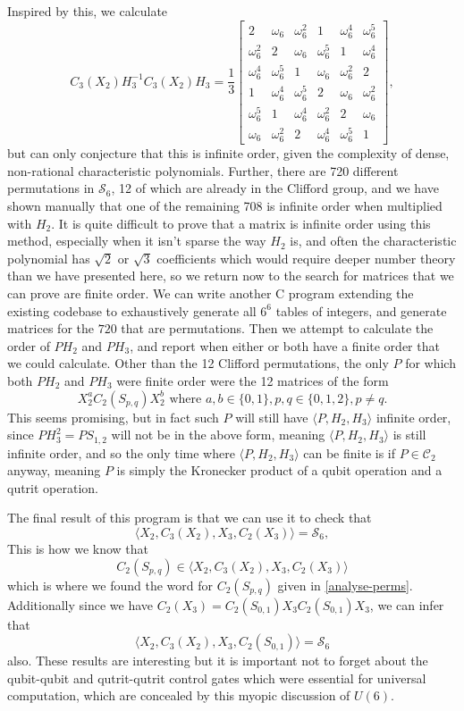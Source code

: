 Inspired by this, we calculate
\[C_3(X_2) H_3^{-1} C_3(X_2) H_3 =
\frac{1}{3} \begin{bmatrix}
	2 & \omega_6 & \omega_6^2 & 1 & \omega_6^4 & \omega_6^5 \\
	\omega_6^2 & 2 & \omega_6 & \omega_6^5 & 1 & \omega_6^4 \\
	\omega_6^4 & \omega_6^5 & 1 & \omega_6 & \omega_6^2 & 2 \\
	1 & \omega_6^4 & \omega_6^5 & 2 & \omega_6 & \omega_6^2 \\
	\omega_6^5 & 1 & \omega_6^4 & \omega_6^2 & 2 & \omega_6 \\
	\omega_6 & \omega_6^2 & 2 & \omega_6^4 & \omega_6^5 & 1
\end{bmatrix},
\]
but can only conjecture that this is infinite order, given the complexity of dense, non-rational characteristic polynomials. Further, there are 720 different permutations in $\mathcal{S}_6$, 12 of which are already in the Clifford group, and we have shown manually that one of the remaining 708 is infinite order when multiplied with $H_2$. It is quite difficult to prove that a matrix is infinite order using this method, especially when it isn't sparse the way $H_2$ is, and often the characteristic polynomial has $\sqrt{2}$ or $\sqrt{3}$ coefficients which would require deeper number theory than we have presented here, so we return now to the search for matrices that we can prove are finite order. We can write another C program extending the existing codebase to exhaustively generate all $6^6$ tables of integers, and generate matrices for the $720$ that are permutations. Then we attempt to calculate the order of $P H_2$ and $P H_3$, and report when either or both have a finite order that we could calculate. Other than the 12 Clifford permutations, the only $P$ for which both $P H_2$ and $P H_3$ were finite order were the 12 matrices of the form
\[X_2^a C_2(S_{p,q}) X_2^b\text{\ where\ }a, b \in \{0, 1\}, p, q \in \{0, 1, 2\}, p \neq q.\]
This seems promising, but in fact such $P$ will still have $\langle P, H_2, H_3\rangle$ infinite order, since $P H_3^2 = P S_{1,2}$ will not be in the above form, meaning $\langle P, H_2, H_3 \rangle$ is still infinite order, and so the only time where $\langle P, H_2, H_3 \rangle$ can be finite is if $P \in \mathcal{C}_2$ anyway, meaning $P$ is simply the Kronecker product of a qubit operation and a qutrit operation.

The final result of this program is that we can use it to check that
\[\langle X_2, C_3(X_2), X_3, C_2(X_3) \rangle = \mathcal{S}_6,\]
This is how we know that
\[C_2(S_{p,q}) \in \langle X_2, C_3(X_2), X_3, C_2(X_3) \rangle\]
which is where we found the word for $C_2(S_{p,q})$ given in \autoref{analyse-perms}. Additionally since we have $C_2(X_3) = C_2(S_{0,1})X_3C_2(S_{0,1})X_3$, we can infer that
\[\langle X_2, C_3(X_2), X_3, C_2(S_{0,1})\rangle = \mathcal{S}_6\]
also. These results are interesting but it is important not to forget about the qubit-qubit and qutrit-qutrit control gates which were essential for universal computation, which are concealed by this myopic discussion of $U(6)$.

